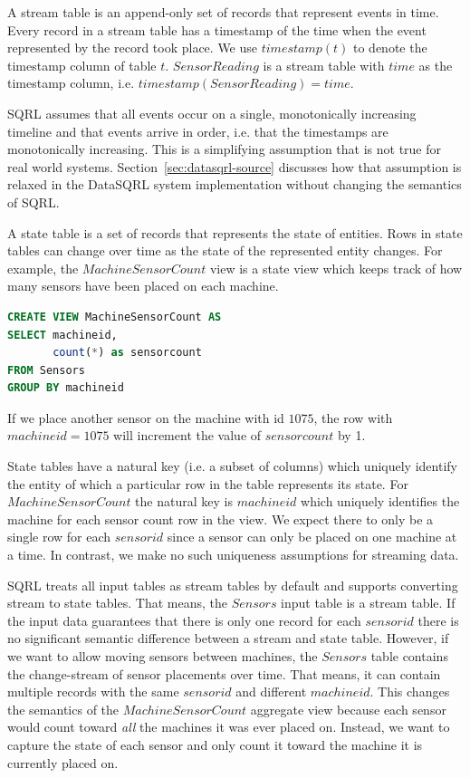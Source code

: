 \documentclass[	DIV=calc,%
							paper=letter,%
							fontsize=11pt,%
							twocolumn]{scrartcl}	 					%
\begin{document}
A stream table is an append-only set of records that represent events in time. Every record in a stream table has a timestamp of the time when the event represented by the record took place. We use $timestamp(t)$ to denote the timestamp column of table $t$. $SensorReading$ is a stream table with $time$ as the timestamp column, i.e. $timestamp(SensorReading) = time$.

SQRL assumes that all events occur on a single, monotonically increasing timeline and that events arrive in order, i.e. that the timestamps are monotonically increasing. This is a simplifying assumption that is not true for real world systems. Section~\ref{sec:datasqrl-source} discusses how that assumption is relaxed in the DataSQRL system implementation without changing the semantics of SQRL.

A state table is a set of records that represents the state of entities. Rows in state tables can change over time as the state of the represented entity changes. For example, the $MachineSensorCount$ view is a state view which keeps track of how many sensors have been placed on each machine.

\begin{lstlisting}[language=SQL]
CREATE VIEW MachineSensorCount AS
SELECT machineid,
       count(*) as sensorcount
FROM Sensors
GROUP BY machineid
\end{lstlisting}

If we place another sensor on the machine with id $1075$, the row with $machineid = 1075$ will increment the value of $sensorcount$ by 1.

State tables have a natural key (i.e. a subset of columns) which uniquely identify the entity of which a particular row in the table represents its state. For $MachineSensorCount$ the natural key is $machineid$ which uniquely identifies the machine for each sensor count row in the view. We expect there to only be a single row for each $sensorid$ since a sensor can only be placed on one machine at a time. In contrast, we make no such uniqueness assumptions for streaming data.

SQRL treats all input tables as stream tables by default and supports converting stream to state tables. That means, the $Sensors$ input table is a stream table. If the input data guarantees that there is only one record for each $sensorid$ there is no significant semantic difference between a stream and state table.
However, if we want to allow moving sensors between machines, the $Sensors$ table contains the change-stream of sensor placements over time. That means, it can contain multiple records with the same $sensorid$ and different $machineid$. This changes the semantics of the $MachineSensorCount$ aggregate view because each sensor would count toward \emph{all} the machines it was ever placed on.
Instead, we want to capture the state of each sensor and only count it toward the machine it is currently placed on.
\end{document}
